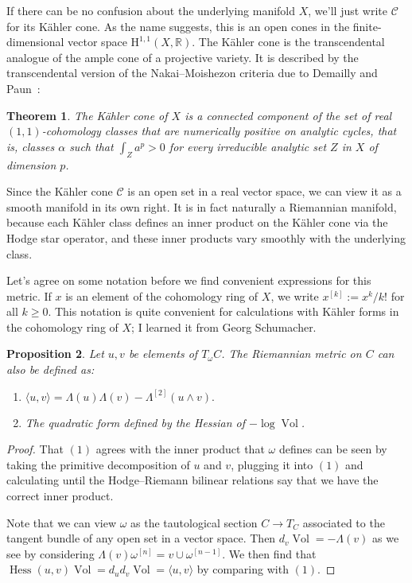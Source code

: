 \documentclass[11pt,a4paper]{amsart}
\newtheorem{theo}{Theorem}[section]
\newtheorem{prop}[theo]{Proposition}
\theoremstyle{definition}
\theoremstyle{remark}
\newcommand{\RR}{\mathbb{R}}
\newcommand{\Vol}{\mathop{\mathrm{Vol}}}
\def\coho#1{\mathrm{H}^{#1}}
\def\kf{\omega}
\def\Lef{\Lambda}
\def\ton{u}
\def\ttw{v}
\def\^#1{^{[#1]}}
\def\KC{C}
\def\RKC{\mathcal{\KC}}
\begin{document}
If there can be no confusion about the underlying manifold $X$, we'll
just write $\RKC$ for its K\"{a}hler cone.  As the name suggests, this is
an open cones in the finite-dimensional vector space
$\coho{1,1}(X,\RR)$. The K\"{a}hler cone is the transcendental analogue
of the ample cone of a projective variety. It is described by the
transcendental version of the Nakai--Moishezon criteria due to Demailly
and Paun~\cite{DemaillyPaun}:


\begin{theo}
The K\"{a}hler cone of $X$ is a connected component of the set of real
$(1,1)$-cohomology classes that are numerically positive on analytic
cycles, that is, classes $\alpha$ such that $\int_{Z} a^p > 0$ for every
irreducible analytic set $Z$ in $X$ of dimension $p$.
\end{theo}



Since the K\"{a}hler cone $\RKC$ is an open set in a real vector space,
we can view it as a smooth manifold in its own right. It is in fact
naturally a Riemannian manifold, because each K\"{a}hler class defines an
inner product on the K\"{a}hler cone via the Hodge star operator, and these inner
products vary smoothly with the underlying class.


Let's agree on some notation before we find convenient expressions for
this metric. If $x$ is an element of the cohomology ring of $X$, we
write $x\^k := x^k/k!$ for all $k \geq 0$. This notation is
quite convenient for calculations with K\"{a}hler forms in the cohomology
ring of $X$; I learned it from Georg Schumacher.


\begin{prop}
Let $\ton,\ttw$ be elements of $T_{\kf}C$. The Riemannian metric on $C$
can also be defined as:
\begin{enumerate}
    \item
\hfil
$
\langle \ton, \ttw \rangle
= \Lef(\ton)\Lef(\ttw)
- \Lef\^2(\ton\wedge\ttw).
$
\hfil

    \item
The quadratic form defined by the Hessian of $-\log\Vol$.
\end{enumerate}
\end{prop}


\begin{proof}
That $(1)$ agrees with the inner product that $\kf$ defines can be seen by
taking the primitive decomposition of $\ton$ and $\ttw$, plugging it into $(1)$
and calculating until the Hodge--Riemann bilinear relations say that we have the
correct inner product.

Note that we can view $\kf$ as the tautological section $C \to T_C$
associated to the tangent bundle of any open set in a vector space.
Then $d_{\ttw} \Vol = -\Lef(\ttw)$ as we see by considering
$\Lef(\ttw) \kf\^n = \ttw \cup \kf\^{n-1}$. We then find that
$\operatorname{Hess}(\ton,\ttw) \Vol 
= d_{\ton} d_{\ttw}\Vol = \langle \ton, \ttw \rangle$ by comparing with
$(1)$.
\end{proof}
\end{document}
